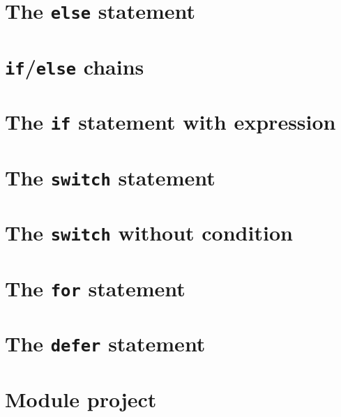 \documentclass[]{book}
\begin{document}
\hypertarget{the-else-statement}{%
\section{\texorpdfstring{The \texttt{else} statement}{The else statement}}\label{the-else-statement}}

\hypertarget{ifelse-chains}{%
\section{\texorpdfstring{\texttt{if}/\texttt{else} chains}{if/else chains}}\label{ifelse-chains}}

\hypertarget{the-if-statement-with-expression}{%
\section{\texorpdfstring{The \texttt{if} statement with expression}{The if statement with expression}}\label{the-if-statement-with-expression}}

\hypertarget{the-switch-statement}{%
\section{\texorpdfstring{The \texttt{switch} statement}{The switch statement}}\label{the-switch-statement}}

\hypertarget{the-switch-without-condition}{%
\section{\texorpdfstring{The \texttt{switch} without condition}{The switch without condition}}\label{the-switch-without-condition}}

\hypertarget{the-for-statement}{%
\section{\texorpdfstring{The \texttt{for} statement}{The for statement}}\label{the-for-statement}}

\hypertarget{the-defer-statement}{%
\section{\texorpdfstring{The \texttt{defer} statement}{The defer statement}}\label{the-defer-statement}}

\hypertarget{module-project}{%
\section*{Module project}\label{module-project}}
\end{document}
